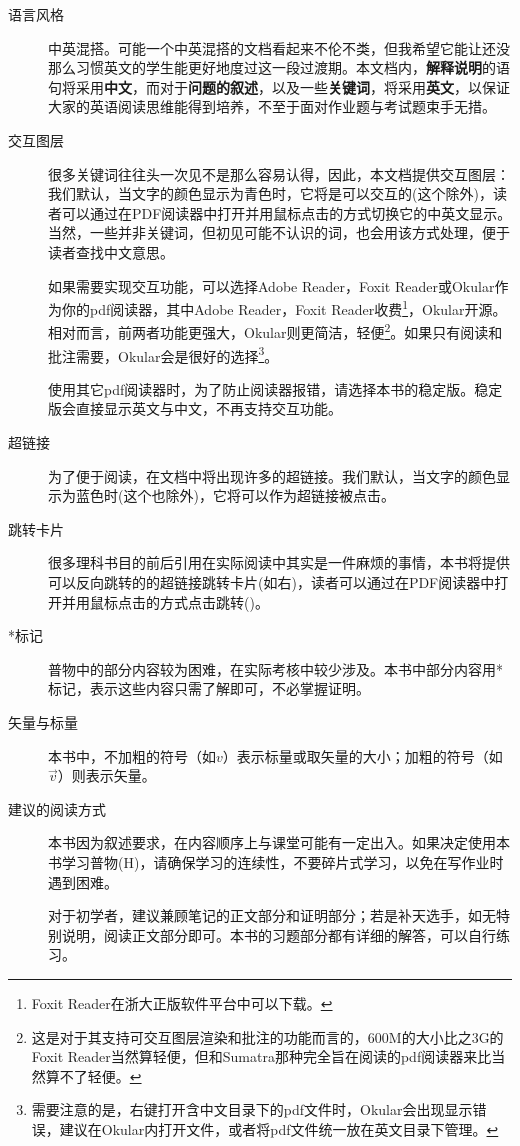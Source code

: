 	\begin{description}
		\item[语言风格]中英混搭。可能一个中英混搭的文档看起来不伦不类，但我希望它能让还没那么习惯英文的学生能更好地度过这一段过渡期。本文档内，\textbf{解释说明}的语句将采用\textbf{中文}，而对于\textbf{问题的叙述}，以及一些\textbf{关键词}，将采用\textbf{英文}，以保证大家的英语阅读思维能得到培养，不至于面对作业题与考试题束手无措。
		\item[交互图层] 很多关键词往往头一次见不是那么容易认得，因此，本文档提供交互图层：我们默认，当文字的颜色显示为{\color{plaincyan}青色}时，它将是可以交互的(这个除外)，读者可以通过在PDF阅读器中打开并用鼠标点击的方式切换它的中英文显示。当然，一些并非关键词，但初见可能不认识的词，也会用该方式处理，便于读者查找中文意思。
		
		如果需要实现交互功能，可以选择Adobe Reader，Foxit Reader或Okular作为你的pdf阅读器，其中Adobe Reader，Foxit Reader收费\footnote{Foxit Reader在浙大正版软件平台中可以下载。}，Okular开源。相对而言，前两者功能更强大，Okular则更简洁，轻便\footnote{这是对于其支持可交互图层渲染和批注的功能而言的，600M的大小比之3G的Foxit Reader当然算轻便，但和Sumatra那种完全旨在阅读的pdf阅读器来比当然算不了轻便。}。如果只有阅读和批注需要，Okular会是很好的选择\footnote{需要注意的是，右键打开含中文目录下的pdf文件时，Okular会出现显示错误，建议在Okular内打开文件，或者将pdf文件统一放在英文目录下管理。}。
		
		使用其它pdf阅读器时，为了防止阅读器报错，请选择本书的稳定版。稳定版会直接显示英文与中文，不再支持交互功能。
		
		\item[超链接]为了便于阅读，在文档中将出现许多的超链接。我们默认，当文字的颜色显示为{\color{blue}蓝色}时(这个也除外)，它将可以作为超链接被点击。
		\item[跳转卡片]很多理科书目的前后引用在实际阅读中其实是一件麻烦的事情，本书将提供可以反向跳转的的超链接跳转卡片(如右)，读者可以通过在PDF阅读器中打开并用鼠标点击的方式点击跳转()。
		\item[*标记]普物中的部分内容较为困难，在实际考核中较少涉及。本书中部分内容用*标记，表示这些内容只需了解即可，不必掌握证明。
		\item [矢量与标量]本书中，不加粗的符号（如$v$）表示标量或取矢量的大小；加粗的符号（如$\vec{v}$）则表示矢量。
		\item [建议的阅读方式] 本书因为叙述要求，在内容顺序上与课堂可能有一定出入。如果决定使用本书学习普物(H)，请确保学习的连续性，不要碎片式学习，以免在写作业时遇到困难。
		
		对于初学者，建议兼顾笔记的正文部分和证明部分；若是补天选手，如无特别说明，阅读正文部分即可。本书的习题部分都有详细的解答，可以自行练习。
	\end{description}
